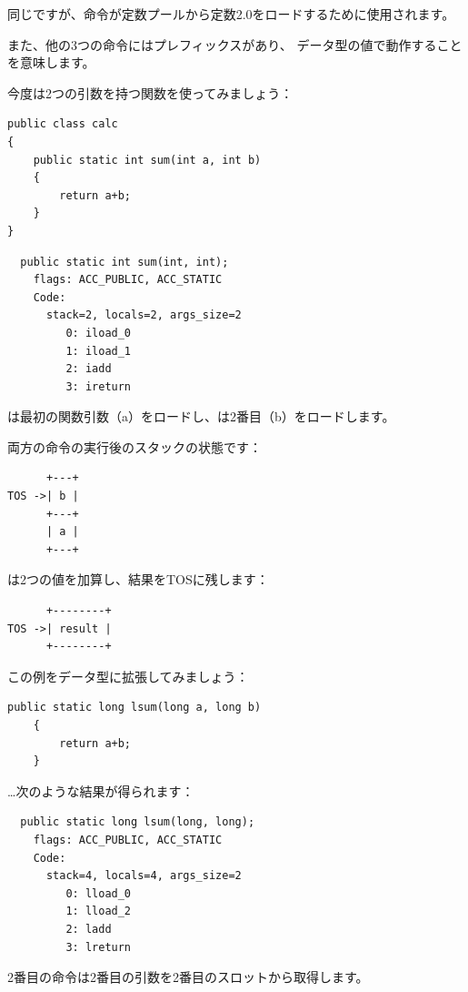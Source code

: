 同じですが、命令が定数プールから定数2.0をロードするために使用されます。

また、他の3つの命令にはプレフィックスがあり、
データ型の値で動作することを意味します。

今度は2つの引数を持つ関数を使ってみましょう：

\begin{lstlisting}[style=customjava]
public class calc
{
	public static int sum(int a, int b)
	{
		return a+b;
	}
}
\end{lstlisting}

\begin{lstlisting}
  public static int sum(int, int);
    flags: ACC_PUBLIC, ACC_STATIC
    Code:
      stack=2, locals=2, args_size=2
         0: iload_0       
         1: iload_1       
         2: iadd          
         3: ireturn       
\end{lstlisting}

は最初の関数引数（a）をロードし、は2番目（b）をロードします。

両方の命令の実行後のスタックの状態です：

\begin{lstlisting}
      +---+
TOS ->| b |
      +---+
      | a |
      +---+
\end{lstlisting}

は2つの値を加算し、結果を\ac{TOS}に残します：

\begin{lstlisting}
      +--------+
TOS ->| result |
      +--------+
\end{lstlisting}

この例をデータ型に拡張してみましょう：

\begin{lstlisting}[style=customjava]
	public static long lsum(long a, long b)
	{
		return a+b;
	}
\end{lstlisting}

\dots 次のような結果が得られます：

\begin{lstlisting}
  public static long lsum(long, long);
    flags: ACC_PUBLIC, ACC_STATIC
    Code:
      stack=4, locals=4, args_size=2
         0: lload_0       
         1: lload_2       
         2: ladd          
         3: lreturn       
\end{lstlisting}

2番目の命令は2番目の引数を2番目のスロットから取得します。

